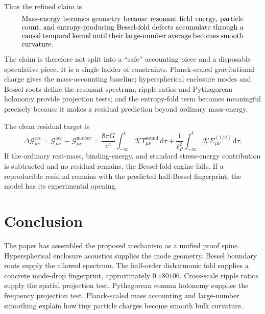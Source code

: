 \documentclass[11pt,a4paper]{article}
\renewcommand{\boxed}[1]{#1}
\newcommand{\dd}{\,\mathrm{d}}
\newcommand{\Tsound}{T_{\mu\nu}^{\mathrm{sound}}}
\newcommand{\Sigmahalf}{\Sigma_{\mu\nu}^{(1/2)}}
\begin{document}
Thus the refined claim is
\begin{equation}
\boxed{
\begin{minipage}{0.9\linewidth}
Mass-energy becomes geometry because resonant field energy, particle count, and entropy-producing Bessel-fold defects accumulate through a causal temporal kernel until their large-number average becomes smooth curvature.
\end{minipage}}
\label{eq:final-claim}
\end{equation}

The claim is therefore not split into a ``safe'' accounting piece and a disposable speculative piece. It is a single ladder of constraints. Planck-scaled gravitational charge gives the mass-accounting baseline; hyperspherical enclosure modes and Bessel roots define the resonant spectrum; ripple ratios and Pythagorean holonomy provide projection tests; and the entropy-fold term becomes meaningful precisely because it makes a residual prediction beyond ordinary mass-energy.

The clean residual target is
\begin{equation}
\boxed{
\Delta\mathcal{G}_{\mu\nu}^{\mathrm{res}}
=
\mathcal{G}_{\mu\nu}^{\mathrm{acc}}-
\mathcal{G}_{\mu\nu}^{\mathrm{matter}}
=
\frac{8\pi G}{c^4}\int_{-\infty}^{t}\mathcal{K}\Tsound\dd\tau
+
\frac{1}{\ell_P^2}\int_{-\infty}^{t}\mathcal{K}\Sigmahalf\dd\tau.
}
\label{eq:residual-target}
\end{equation}
If the ordinary rest-mass, binding-energy, and standard stress-energy contribution is subtracted and no residual remains, the Bessel-fold engine fails. If a reproducible residual remains with the predicted half-Bessel fingerprint, the model has its experimental opening.

\section{Conclusion}

The paper has assembled the proposed mechanism as a unified proof spine. Hyperspherical enclosure acoustics supplies the mode geometry. Bessel boundary roots supply the allowed spectrum. The half-order disharmonic fold supplies a concrete mode-drop fingerprint, approximately $0.180106$. Cross-scale ripple ratios supply the spatial projection test. Pythagorean comma holonomy supplies the frequency projection test. Planck-scaled mass accounting and large-number smoothing explain how tiny particle charges become smooth bulk curvature.
\end{document}
